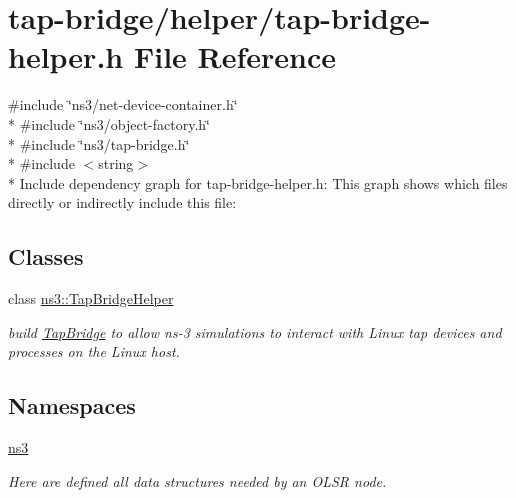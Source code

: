 \hypertarget{tap-bridge-helper_8h}{}\section{tap-\/bridge/helper/tap-\/bridge-\/helper.h File Reference}
\label{tap-bridge-helper_8h}
{\ttfamily \#include \char`\"{}ns3/net-\/device-\/container.\+h\char`\"{}}\\*
{\ttfamily \#include \char`\"{}ns3/object-\/factory.\+h\char`\"{}}\\*
{\ttfamily \#include \char`\"{}ns3/tap-\/bridge.\+h\char`\"{}}\\*
{\ttfamily \#include $<$string$>$}\\*
Include dependency graph for tap-\/bridge-\/helper.h\+:
This graph shows which files directly or indirectly include this file\+:
\subsection*{Classes}
\begin{DoxyCompactItemize}
\item 
class \hyperlink{classns3_1_1TapBridgeHelper}{ns3\+::\+Tap\+Bridge\+Helper}
\begin{DoxyCompactList}\small\item\em build \hyperlink{classns3_1_1TapBridge}{Tap\+Bridge} to allow ns-\/3 simulations to interact with Linux tap devices and processes on the Linux host. \end{DoxyCompactList}\end{DoxyCompactItemize}
\subsection*{Namespaces}
\begin{DoxyCompactItemize}
\item 
 \hyperlink{namespacens3}{ns3}
\begin{DoxyCompactList}\small\item\em Here are defined all data structures needed by an O\+L\+SR node. \end{DoxyCompactList}\end{DoxyCompactItemize}

